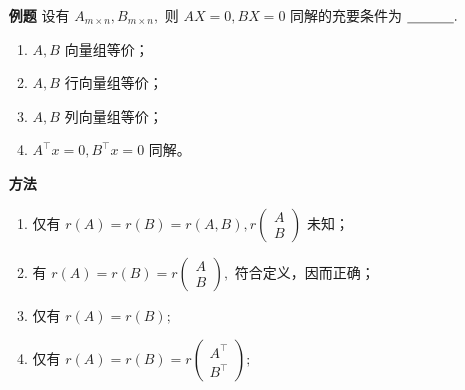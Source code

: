 \begin{itemize}
    \item[\textbf{例题}] 设有 $ A_{m\times n},B_{m\times n}, $ 则
    $ AX = 0,BX = 0 $ 同解的充要条件为 $ \underline{~~~~~~~~~~}. $ 
    \begin{enumerate}[label = \Alph*)]
        \item $ A,B $ 向量组等价；
        \item $ A,B $ 行向量组等价；
        \item $ A,B $ 列向量组等价；
        \item $ A^\top x = 0,B^\top x = 0 $ 同解。
    \end{enumerate}
    \item[\textbf{方法}] 
    \begin{enumerate}[label = \Alph*)]
        \item 仅有 $ r(A) = r(B) = r(A,B), r\begin{pmatrix}
            A\\B
        \end{pmatrix} $ 未知；
        \item 有 $ r(A) = r(B) =r\begin{pmatrix}
            A\\B
        \end{pmatrix}, $ 符合定义，因而正确；
        \item 仅有 $ r(A) = r(B); $
        \item 仅有 $ r(A) = r(B) =r\begin{pmatrix}
            A^\top\\B^\top
        \end{pmatrix}; $
    \end{enumerate}
\end{itemize}

